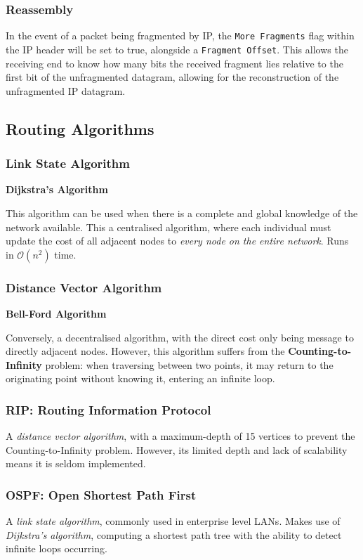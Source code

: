 \documentclass{article}
\begin{document}
\subsubsection{Reassembly}

In the event of a packet being fragmented by IP, the \texttt{More Fragments} flag within the IP header will be set to true, alongside a \texttt{Fragment Offset}. This allows the receiving end to know how many bits the received fragment lies relative to the first bit of the unfragmented datagram, allowing for the reconstruction of the unfragmented IP datagram.

\subsection{Routing Algorithms}
\subsubsection{Link State Algorithm}
\textbf{Dijkstra's Algorithm}

This algorithm can be used when there is a complete and global knowledge of the network available. This a centralised algorithm, where each individual must update the cost of all adjacent nodes to \textit{every node on the entire network}. Runs in $\mathcal{O}(n^2)$ time.

\subsubsection{Distance Vector Algorithm}
\textbf{Bell-Ford Algorithm}

Conversely, a decentralised algorithm, with the direct cost only being message to directly adjacent nodes. However, this algorithm suffers from the \textbf{Counting-to-Infinity} problem: when traversing between two points, it may return to the originating point without knowing it, entering an infinite loop.

\subsubsection{RIP: Routing Information Protocol}

A \textit{distance vector algorithm}, with a maximum-depth of 15 vertices to prevent the Counting-to-Infinity problem. However, its limited depth and lack of scalability means it is seldom implemented.

\subsubsection{OSPF: Open Shortest Path First}
A \textit{link state algorithm}, commonly used in enterprise level LANs. Makes use of \textit{Dijkstra's algorithm}, computing a shortest path tree with the ability to detect infinite loops occurring.
\end{document}
